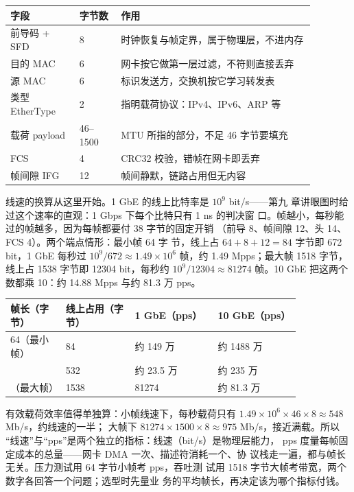 \begin{longtable}{L{0.20\linewidth}L{0.12\linewidth}L{0.56\linewidth}}
\toprule
字段 & 字节数 & 作用 \\
\midrule
前导码 + SFD & 8 & 时钟恢复与帧定界，属于物理层，不进内存 \\\tablerowrule
目的 MAC & 6 & 网卡按它做第一层过滤，不符则直接丢弃 \\\tablerowrule
源 MAC & 6 & 标识发送方，交换机按它学习转发表 \\\tablerowrule
类型 EtherType & 2 & 指明载荷协议：IPv4、IPv6、ARP 等 \\\tablerowrule
载荷 payload & 46--1500 & MTU 所指的部分，不足 46 字节要填充 \\\tablerowrule
FCS & 4 & CRC32 校验，错帧在网卡即丢弃 \\\tablerowrule
帧间隙 IFG & 12 & 帧间静默，链路占用但无内容 \\
\bottomrule
\end{longtable}

线速的换算从这里开始。1 GbE 的线上比特率是 $10^{9}$ bit/s——第九
章讲眼图时给过这个速率的直观：1 Gbps 下每个比特只有 1 ns 的判决窗
口。帧越小，每秒能过的帧越多，因为每帧都要付 38 字节的固定开销
（前导 8、帧间隙 12、头 14、FCS 4）。两个端点情形：最小帧 64 字
节，线上占 $64+8+12=84$ 字节即 672 bit，1 GbE 每秒过
$10^{9}/672\approx1.49\times10^{6}$ 帧，约 1.49 Mpps；最大帧 1518
字节，线上占 1538 字节即 12304 bit，每秒约
$10^{9}/12304\approx81274$ 帧。10 GbE 把这两个数都乘 10：约 14.88
Mpps 与约 81.3 万 pps。

\begin{longtable}{L{0.16\linewidth}L{0.20\linewidth}L{0.24\linewidth}L{0.24\linewidth}}
\toprule
帧长（字节） & 线上占用（字节） & 1 GbE（pps） & 10 GbE（pps） \\
（最小帧） & 84 & 约 149 万 & 约 1488 万 \\ & 532 & 约 23.5 万 & 约 235 万 \\（最大帧） & 1538 & 81274 & 约 81.3 万 \\
\bottomrule
\end{longtable}

有效载荷效率值得单独算：小帧线速下，每秒载荷只有
$1.49\times10^{6}\times46\times8\approx548$ Mb/s，约线速的一半；
大帧下 $81274\times1500\times8\approx975$ Mb/s，接近满载。所以
“线速”与“pps”是两个独立的指标：线速（bit/s）是物理层能力，
pps 度量每帧固定成本的总量——网卡 DMA 一次、描述符消耗一个、协
议栈走一遍，都与帧长无关。压力测试用 64 字节小帧考 pps，吞吐测
试用 1518 字节大帧考带宽，两个数字各回答一个问题；选型时先量业
务的平均帧长，再决定该为哪个指标付钱。

